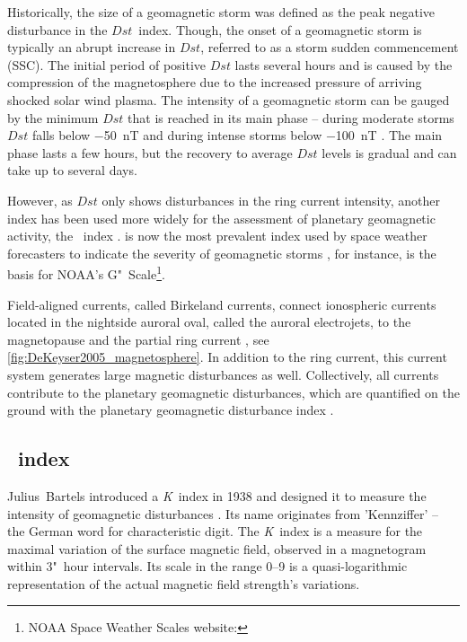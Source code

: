 Historically, the size of a geomagnetic storm was defined as the peak negative disturbance in the $Dst$~index. Though, the onset of a geomagnetic storm is typically an abrupt increase in $Dst$, referred to as a storm sudden commencement (SSC). The initial period of positive $Dst$ lasts several hours and is caused by the compression of the magnetosphere due to the increased pressure of arriving shocked solar wind plasma. The intensity of a geomagnetic storm can be gauged by the minimum $Dst$ that is reached in its main phase -- during moderate storms $Dst$ falls below \SI{-50}{\nano\tesla} and during intense storms below \SI{-100}{\nano\tesla} \citep{Gonzalez1994}. The main phase lasts a few hours, but the recovery to average $Dst$ levels is gradual and can take up to several days.

However, as $Dst$ only shows disturbances in the ring current intensity, another index has been used more widely for the assessment of planetary geomagnetic activity, the \Kp~index \citep{Gonzalez1994}. \Kp{} is now the most prevalent index used by space weather forecasters to indicate the severity of geomagnetic storms \citep{Wing2005}, for instance, \Kp{} is the basis for NOAA's G"~Scale\footnote{NOAA Space Weather Scales website: }.

Field-aligned currents, called Birkeland currents, connect ionospheric currents located in the nightside auroral oval, called the auroral electrojets, to the magnetopause and the partial ring current \citep{Coxon2014}, see \autoref{fig:DeKeyser2005_magnetosphere}. In addition to the ring current, this current system generates large magnetic disturbances as well. Collectively, all currents contribute to the planetary geomagnetic disturbances, which are quantified on the ground with the planetary geomagnetic disturbance index \Kp{}.


\subsection{\Kp{}~index}
\label{sec:kp_index}
Julius~Bartels introduced a \textit{K}~index in 1938 and designed it to measure the intensity of geomagnetic disturbances \citep{Bartels1939}. Its name originates from 'Kennziffer' -- the German word for characteristic digit. The \textit{K}~index is a measure for the maximal variation of the surface magnetic field, observed in a magnetogram within 3"~hour intervals. Its scale in the range 0--9 is a quasi-logarithmic representation of the actual magnetic field strength's variations.

